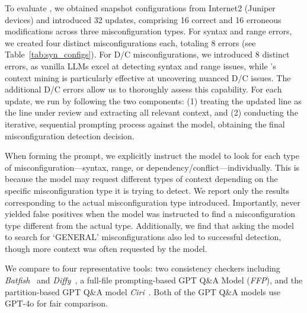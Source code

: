 To evaluate \sysname{}, we obtained snapshot configurations from Internet2 (Juniper devices) and introduced 32 updates, comprising 16 correct and 16 erroneous modifications across three misconfiguration types. 
For syntax and range errors, we created four distinct misconfigurations each, totaling 8 errors (see Table~\ref{tab:syn_configs}). For D/C misconfigurations, we introduced 8 distinct errors, as vanilla LLMs excel at detecting syntax and range issues, while \sysname{}’s context mining is particularly effective at uncovering nuanced D/C issues. The additional D/C errors allow us to thoroughly assess this capability.
For each update, we run \sysname{} by following the two components: (1) treating the updated line as the line under review and extracting all relevant context, and (2) conducting the iterative, sequential prompting process against the model, obtaining the final misconfiguration detection decision.

When forming the prompt, we explicitly instruct the model to look for each type of misconfiguration—syntax, range, or dependency/conflict—individually. This is because the model may request different types of context depending on the specific misconfiguration type it is trying to detect. We report only the results corresponding to the actual misconfiguration type introduced. Importantly, \sysname{} never yielded false positives when the model was instructed to find a misconfiguration type different from the actual type. Additionally, we find that asking the model to search for `GENERAL' misconfigurations also led to successful detection, though more context was often requested by the model.

We compare \sysname{} to four representative tools: two consistency checkers including \textit{Batfish}~\cite{fogel2015general} and \textit{Diffy}~\cite{kakarla2024diffy}, a full-file prompting-based GPT Q\&A Model (\textit{FFP}), and the partition-based GPT Q\&A model \textit{Ciri}~\cite{lian2023configuration}. Both of the GPT Q\&A models use GPT-4o for fair comparison. 

